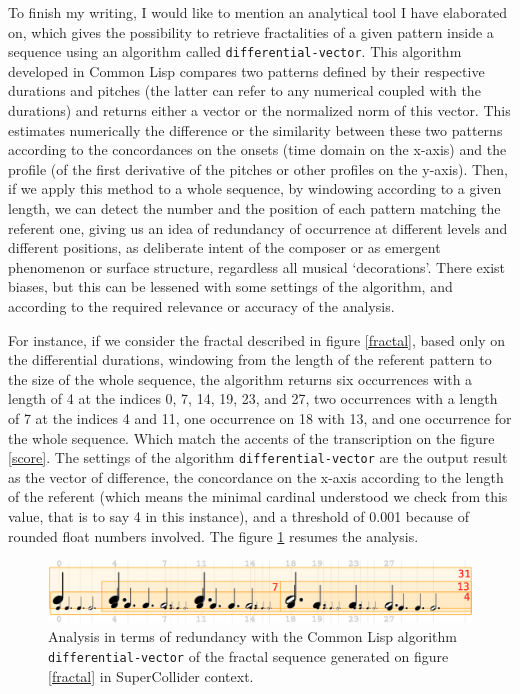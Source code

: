 \documentclass{article}
\begin{document}
To finish my writing, I would like to mention an analytical tool I have elaborated on, which gives the possibility to retrieve fractalities of a given pattern inside a sequence using an algorithm called \texttt{differential-vector}\cite[Chapter 5]{yx}. This algorithm developed in Common Lisp compares two patterns defined by their respective durations and pitches (the latter can refer to any numerical coupled with the durations) and returns either a vector or the normalized norm of this vector. This estimates numerically the difference or the similarity between these two patterns according to the concordances on the onsets (time domain on the x-axis) and the profile (of the first derivative of the pitches or other profiles on the y-axis).
Then, if we apply this method to a whole sequence, by windowing according to a given length, we can detect the number and the position of each pattern matching the referent one, giving us an idea of redundancy of occurrence at different levels and different positions, as deliberate intent of the composer or as emergent phenomenon or surface structure, regardless all musical `decorations'. There exist biases, but this can be lessened with some settings of the algorithm, and according to the required relevance or accuracy of the analysis.

For instance, if we consider the fractal described in figure \ref{fractal}, based only on the differential durations, windowing from the length of the referent pattern to the size of the whole sequence, the algorithm returns six occurrences with a length of 4 at the indices 0, 7, 14, 19, 23, and 27, two occurrences with a length of 7 at the indices 4 and 11, one occurrence on 18 with 13, and one occurrence for the whole sequence.
Which match the accents of the transcription on the figure \ref{score}. The settings of the algorithm \texttt{differential-vector} are the output result as the vector of difference, the concordance on the x-axis according to the length of the referent (which means the minimal cardinal understood we check from this value, that is to say 4 in this instance), and a threshold of 0.001 because of rounded float numbers involved. The figure \ref{df} resumes the analysis.

\begin{figure}[htbp]
\includegraphics[width=\textwidth]{diff-vec}
\caption{Analysis in terms of redundancy with the Common Lisp algorithm \texttt{differential-vector} of the fractal sequence generated on figure \ref{fractal} in SuperCollider context.}
\label{df}
\end{figure}
\end{document}
